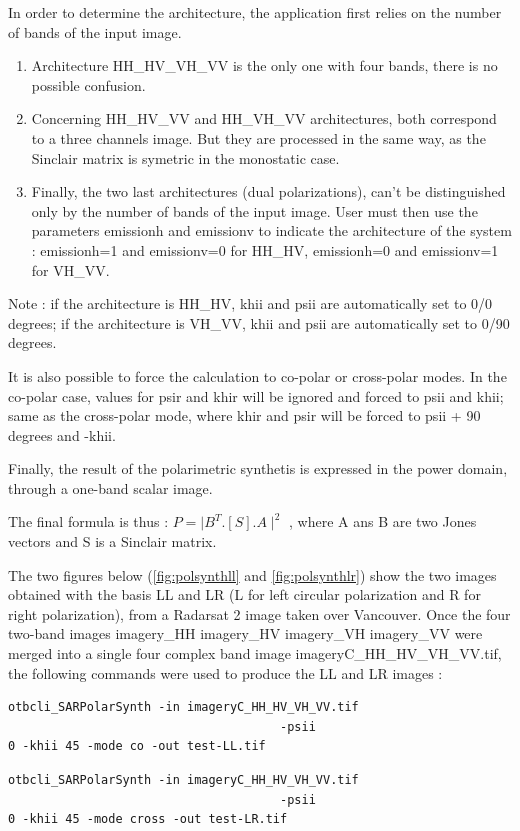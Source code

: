 In order to determine the architecture, the application first relies on the number of bands of the input image.
\begin{enumerate}
\item Architecture HH\_HV\_VH\_VV is the only one with four bands, there is no possible confusion.
\item Concerning HH\_HV\_VV and HH\_VH\_VV architectures, both correspond to a three channels image. But they are processed in the same way, as the Sinclair matrix is symetric in the monostatic case.
\item Finally, the two last architectures (dual polarizations), can't be distinguished only by the number of bands of the input image. User must then use the parameters emissionh and emissionv to indicate the architecture of the system : emissionh=1 and emissionv=0 for HH\_HV,  emissionh=0 and emissionv=1 for VH\_VV.
\end{enumerate}
Note : if the architecture is HH\_HV, khii and psii are automatically set to 0/0 degrees; if the architecture is VH\_VV, khii and psii are automatically set to 0/90 degrees.

It is also possible to force the calculation to co-polar or cross-polar modes.
In the co-polar case, values for psir and khir will be ignored and forced to psii and khii; same as the cross-polar mode, where khir and psir will be forced to psii + 90 degrees and -khii.

Finally, the result of the polarimetric synthetis is expressed in the power domain, through a one-band scalar image. \newline


 
The final formula is thus : $P=\mid B^T.[S].A\mid^2$ , where A ans B are two Jones vectors and S is a Sinclair matrix.
 
The two figures below (\ref{fig:polsynthll} and \ref{fig:polsynthlr}) show the two images obtained with the basis LL and LR (L for left circular polarization and R for right polarization),
from a Radarsat 2 image taken over Vancouver. Once the four two-band images imagery\_HH imagery\_HV imagery\_VH imagery\_VV were merged 
into a single four complex band image imageryC\_HH\_HV\_VH\_VV.tif, the following commands were used to produce the LL and LR images :

\begin{verbatim} 
otbcli_SARPolarSynth -in imageryC_HH_HV_VH_VV.tif 
									  -psii
0 -khii 45 -mode co -out test-LL.tif 
\end{verbatim}
\begin{verbatim} 
otbcli_SARPolarSynth -in imageryC_HH_HV_VH_VV.tif 
									  -psii
0 -khii 45 -mode cross -out test-LR.tif 
\end{verbatim}

